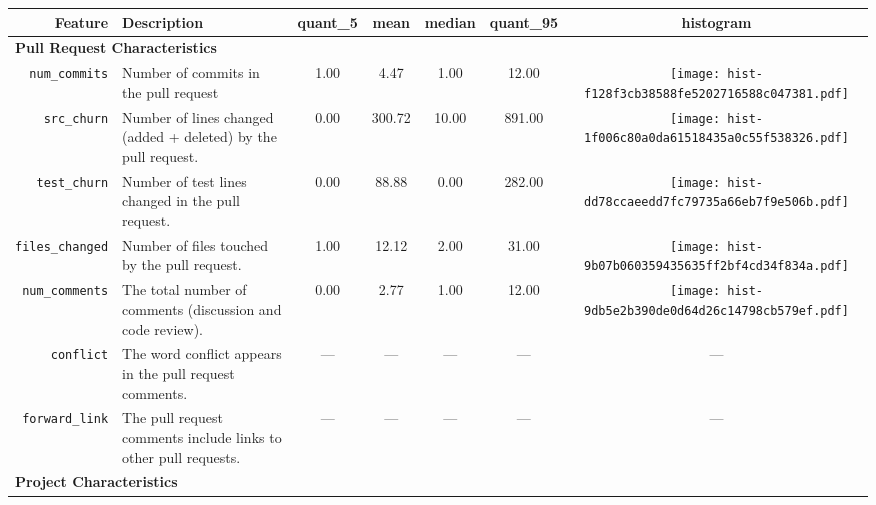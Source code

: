 \begin{table*}[ht]
\centering
\begin{small}
\begin{tabular}{rp{20em}ccccc}
  \hline
Feature & Description & quant\_5 & mean & median & quant\_95 & histogram \\ 
  \hline

  \multicolumn{2}{l}{\bf{Pull Request Characteristics}}\\

  \texttt{num\_commits} & Number of commits in the pull request & 1.00 & 4.47 & 1.00 & 12.00 & \texttt{[image: hist-f128f3cb38588fe5202716588c047381.pdf]} \\ 
  \texttt{src\_churn} & Number of lines changed (added + deleted) by the pull request. & 0.00 & 300.72 & 10.00 & 891.00 & \texttt{[image: hist-1f006c80a0da61518435a0c55f538326.pdf]} \\ 
  \texttt{test\_churn} & Number of test lines changed in the pull request. & 0.00 & 88.88 & 0.00 & 282.00 & \texttt{[image: hist-dd78ccaeedd7fc79735a66eb7f9e506b.pdf]} \\ 
  \texttt{files\_changed} & Number of files touched by the pull request. & 1.00 & 12.12 & 2.00 & 31.00 & \texttt{[image: hist-9b07b060359435635ff2bf4cd34f834a.pdf]} \\ 
  \texttt{num\_comments} & The total number of comments (discussion and code review). & 0.00 & 2.77 & 1.00 & 12.00 & \texttt{[image: hist-9db5e2b390de0d64d26c14798cb579ef.pdf]} \\ 
  
 \texttt{conflict} & The word conflict appears in the pull request comments.
 & --- & --- & --- & --- & ---\\

    \texttt{forward\_link} & The pull request comments include links to other
    pull requests. & --- & --- & --- & --- & --- \\


  \multicolumn{2}{l}{\bf{Project Characteristics}}\\


\end{tabular}
\end{small}
\end{table*}
